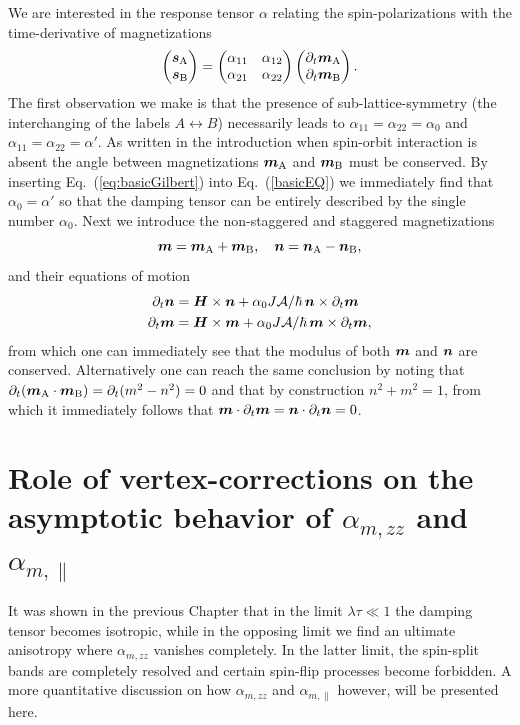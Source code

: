 We are interested in the response tensor $\alpha$ relating the spin-polarizations with the time-derivative of magnetizations
\begin{equation}
\label{eq:basicGilbert}
    \begin{pmatrix}
    \boldsymbol{s}_\text{A} \\ \boldsymbol{s}_\text{B}
    \end{pmatrix}
    =
    \begin{pmatrix}
    \alpha_{11}  &  \alpha_{12} \\ \alpha_{21}  &  \alpha_{22}
    \end{pmatrix}
    \begin{pmatrix}
    \partial_t \boldsymbol{m}_\text{A} \\ \partial_t\boldsymbol{m}_\text{B}
    \end{pmatrix}.
\end{equation}
The first observation we make is that the presence of sub-lattice-symmetry (the interchanging of the labels $A\leftrightarrow B$) necessarily leads to $\alpha_{11}=\alpha_{22}=\alpha_0$ and $\alpha_{11}=\alpha_{22}=\alpha'$. As written in the introduction when spin-orbit interaction is absent the angle between magnetizations $\boldsymbol{m}_\text{A}$ and $\boldsymbol{m}_\text{B}$ must be conserved. By inserting Eq.~(\ref{eq:basicGilbert}) into Eq.~(\ref{basicEQ}) we immediately find that $\alpha_0=\alpha'$ so that the damping tensor can be entirely described by the single number $\alpha_0$. Next we introduce the non-staggered and staggered magnetizations 
\begin{equation}
    \boldsymbol{m} = \boldsymbol{m}_\text{A} + \boldsymbol{m}_\text{B}, \quad \boldsymbol{n} = \boldsymbol{n}_\text{A} - \boldsymbol{n}_\text{B},
\end{equation}
and their equations of motion
\begin{align}
    \partial_t{\boldsymbol{n}}   & = \boldsymbol{H}\times\boldsymbol{n}  + \alpha_0 J\mathcal{A}/\hbar\,\boldsymbol{n}\times \partial_t\boldsymbol{m}\\
    \partial_t{\boldsymbol{m}}   & = \boldsymbol{H}\times\boldsymbol{m}  + \alpha_0 J\mathcal{A}/\hbar\,\boldsymbol{m}\times \partial_t\boldsymbol{m},
\end{align}
from which one can immediately see that the modulus of both $\boldsymbol{m}$ and $\boldsymbol{n}$ are conserved. Alternatively one can reach the same conclusion by noting that $\partial_t (\boldsymbol{m}_\text{A}\cdot\boldsymbol{m}_\text{B}) = \partial_t (m^2-n^2) = 0$ and that by construction $n^2+m^2=1$, from which it immediately follows that $\boldsymbol{m}\cdot\partial_t\boldsymbol{m} = \boldsymbol{n}\cdot\partial_t\boldsymbol{n} = 0$. 


\section{Role of vertex-corrections on the asymptotic behavior of $\alpha_{m,zz}$ and $\alpha_{m,\parallel}$}
It was shown in the previous Chapter that in the limit $\lambda\tau\ll1$ the damping tensor becomes isotropic, while in the opposing limit we find an ultimate anisotropy where $\alpha_{m,zz}$ vanishes completely. In the latter limit, the spin-split bands are completely resolved and certain spin-flip processes become forbidden. A more quantitative discussion on how $\alpha_{m,zz}$ and $\alpha_{m,\parallel}$ however, will be presented here. 


